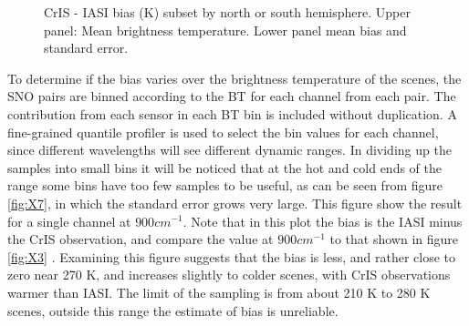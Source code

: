 \documentclass[11pt]{article}
\begin{document}
\begin{figure}[htb]
  \centering
  \quad
  \caption{CrIS - IASI bias (K) subset by north or south hemisphere. Upper panel: Mean brightness temperature. Lower panel mean bias and standard error.}%
  \label{fig:X6}
\end{figure}

To determine if the bias varies over the brightness temperature of the scenes, the SNO pairs are binned according to the BT for each channel from each pair. The contribution from each sensor in each BT bin is included without duplication.  A fine-grained quantile profiler is used to select the bin values for each channel, since different wavelengths will see different dynamic ranges.  In dividing up the samples into small bins it will be noticed that at the hot and cold ends of the range some bins have too few samples to be useful, as can be seen from figure \ref{fig:X7}, in which the standard error grows very large. This figure show the result for a single channel at $900 cm^{-1}$. Note that in this plot the bias is the IASI minus the CrIS observation, and compare the value at \(900 cm^{-1}\) to that shown in figure \ref{fig:X3} . Examining this figure suggests that the bias is less, and rather close to zero near 270 K, and increases slightly to colder scenes, with CrIS observations warmer than IASI. The limit of the sampling is from about 210 K to 280 K scenes, outside this range the estimate of bias is unreliable.
\end{document}
